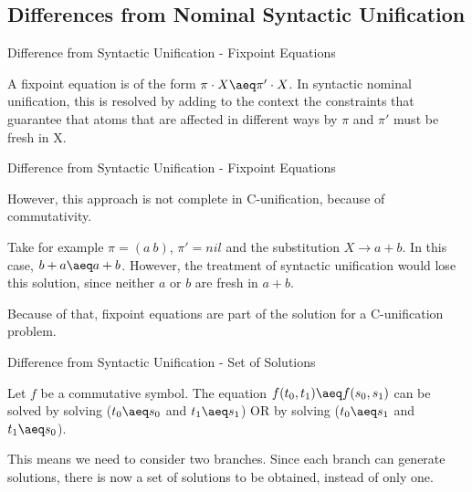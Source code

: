 \subsection{Differences from Nominal Syntactic Unification}
\begin{frame}{Difference from Syntactic Unification - Fixpoint Equations}
     \par A fixpoint equation is of the form $ \pi \cdot X \aeq \pi' \cdot X$. In syntactic nominal
     unification, this is resolved by adding to the context the constraints that
     guarantee that 
     atoms that are affected in different ways by $\pi$ and $\pi'$ must be fresh in
     X.  
\end{frame}
\begin{frame}{Difference from Syntactic Unification - Fixpoint Equations}
     \par However, this approach is not complete in C-unification, because of
     commutativity. 
     \par Take for example $\pi = (a \ b)$, $\pi' = nil$ and the
     substitution $X \rightarrow a+b$. In this case, $b + a \aeq a+b$. However,
     the treatment of syntactic unification would lose this solution, since neither
     $a$ or $b$ are fresh in $a+b$. 
     \par Because of that, fixpoint equations are part of the solution for a
     C-unification problem. 
\end{frame}

\begin{frame}{Difference from Syntactic Unification - Set of Solutions}
    \par Let $f$ be a commutative symbol. The equation $f(t_0, t_1) \aeq f(s_0, s_1)$
    can be solved by solving ($t_0 \aeq s_0$ and $t_1 \aeq s_1$) OR by solving 
    ($t_0 \aeq s_1$ and $t_1 \aeq s_0$). 
    \newline
    \par This means we need to consider two branches. Since each branch can generate
    solutions, there is now a set of solutions to be obtained, instead of only one.  
\end{frame}


